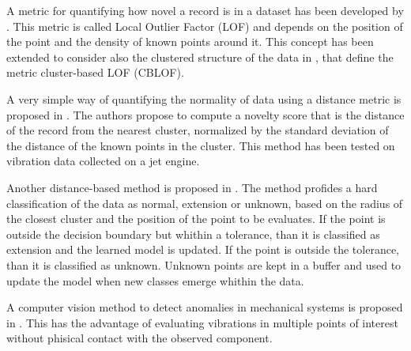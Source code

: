 A metric for quantifying how novel a record is in a dataset has been developed by \cite{Breunig00}. This metric is called Local Outlier Factor (LOF) and depends on the position of the point and the density of known points around it. This concept has been extended to consider also the clustered structure of the data in \cite{HE2003}, that define the metric cluster-based LOF (CBLOF).

A very simple way of quantifying the normality of data using a distance metric is proposed in \cite{Clifton06}. The authors propose to compute a novelty score that is the distance of the record from the nearest cluster, normalized by the standard deviation of the distance of the known points in the cluster. This method has been tested on vibration data collected on a jet engine.

Another distance-based method  is proposed in \cite{Garcia19}. The method profides a hard classification of the data as normal, extension or unknown, based on the radius of the closest cluster and the position of the point to be evaluates. If the point is outside the decision boundary but whithin a tolerance, than it is classified as extension and the learned model is updated. If the point is outside the tolerance, than it is classified as unknown. Unknown points are kept in a buffer and used to update the model when new classes emerge whithin the data.


A  computer vision method to detect anomalies in mechanical systems is proposed in \cite{SPYTEK2023109823}. This has the advantage of evaluating vibrations in multiple points of interest without phisical contact with the observed component.